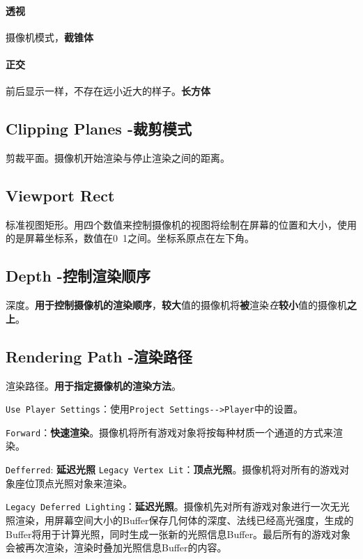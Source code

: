 \documentclass[UTF8,a4paper,12pt]{ctexbook}
\begin{document}
			\paragraph{透视}
				摄像机模式，\textbf{截锥体}
				
			\paragraph{正交}
				前后显示一样，不存在远小近大的样子。\textbf{长方体}
				
		\subsection{Clipping Planes -裁剪模式}
			剪裁平面。摄像机开始渲染与停止渲染之间的距离。
			
		\subsection{Viewport Rect}
			标准视图矩形。用四个数值来控制摄像机的视图将绘制在屏幕的位置和大小，使用的是屏幕坐标系，数值在0~1之间。坐标系原点在左下角。
			
		\subsection{Depth -控制渲染顺序}
			深度。\textbf{用于控制摄像机的渲染顺序}，\textbf{较大}值的摄像机将\textbf{被}渲染\textit{在}\textbf{较小}值的摄像机\textbf{之上}。
			
		\subsection{Rendering Path -渲染路径}
			渲染路径。\textbf{用于指定摄像机的渲染方法}。
			
			\verb|Use Player Settings|：使用\verb|Project Settings-->Player|中的设置。
			
			\verb|Forward|：\textbf{快速渲染}。摄像机将所有游戏对象将按每种材质一个通道的方式来渲染。
			
			\verb|Defferred|: \textbf{延迟光照}
			\verb|Legacy Vertex Lit|：\textbf{顶点光照}。摄像机将对所有的游戏对象座位顶点光照对象来渲染。
			
			\verb|Legacy Deferred Lighting|：\textbf{延迟光照}。摄像机先对所有游戏对象进行一次无光照渲染，用屏幕空间大小的Buffer保存几何体的深度、法线已经高光强度，生成的Buffer将用于计算光照，同时生成一张新的光照信息Buffer。最后所有的游戏对象会被再次渲染，渲染时叠加光照信息Buffer的内容。
			
\end{document}
